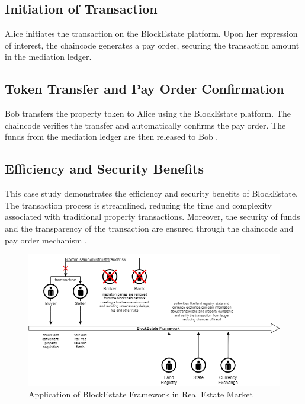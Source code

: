 \documentclass[3p,times]{elsarticle}
\begin{document}
\subsection{Initiation of Transaction}

Alice initiates the transaction on the BlockEstate platform. Upon her expression of interest, the chaincode generates a pay order, securing the transaction amount in the mediation ledger.

\subsection{Token Transfer and Pay Order Confirmation}

Bob transfers the property token to Alice using the BlockEstate platform. The chaincode verifies the transfer and automatically confirms the pay order. The funds from the mediation ledger are then released to Bob \cite{hutson2023architecting}.

\subsection{Efficiency and Security Benefits}

This case study demonstrates the efficiency and security benefits of BlockEstate. The transaction process is streamlined, reducing the time and complexity associated with traditional property transactions. Moreover, the security of funds and the transparency of the transaction are ensured through the chaincode and pay order mechanism \cite{bhatia2019exploration}.

\begin{figure}[H]
    \centering
    \includegraphics[width=1.0\linewidth]{images/use case.drawio.png}
    \caption{Application of BlockEstate Framework in Real Estate Market}
    \label{fig:fig3}
\end{figure}
\end{document}
